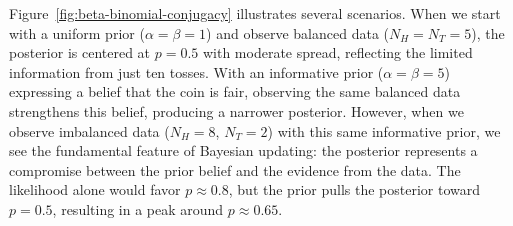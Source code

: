 \begin{exampleBox}
    Figure~\ref{fig:beta-binomial-conjugacy} illustrates several scenarios. When we start with a uniform prior ($\alpha = \beta = 1$) and observe balanced data ($N_H = N_T = 5$), the posterior is centered at $p = 0.5$ with moderate spread, reflecting the limited information from just ten tosses. With an informative prior ($\alpha = \beta = 5$) expressing a belief that the coin is fair, observing the same balanced data strengthens this belief, producing a narrower posterior. However, when we observe imbalanced data ($N_H = 8$, $N_T = 2$) with this same informative prior, we see the fundamental feature of Bayesian updating: the posterior represents a compromise between the prior belief and the evidence from the data. The likelihood alone would favor $p \approx 0.8$, but the prior pulls the posterior toward $p = 0.5$, resulting in a peak around $p \approx 0.65$.


\end{exampleBox}
